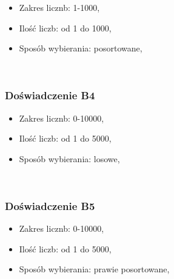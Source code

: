 \documentclass[11pt]{article}
\providecommand{\tightlist}{%
      \setlength{\itemsep}{0pt}\setlength{\parskip}{0pt}}
\begin{document}
\begin{itemize}
\tightlist
\item
  Zakres licznb: 1-1000,
\item
  Ilość liczb: od 1 do 1000,
\item
  Sposób wybierania: posortowane,
\end{itemize}

    \begin{center}
    \end{center}
    { \hspace*{\fill} \\}
    
    \hypertarget{doux15bwiadczenie-b4}{%
\subsubsection{Doświadczenie B4}\label{doux15bwiadczenie-b4}}

\begin{itemize}
\tightlist
\item
  Zakres licznb: 0-10000,
\item
  Ilość liczb: od 1 do 5000,
\item
  Sposób wybierania: losowe,
\end{itemize}


    \begin{center}
    \end{center}
    { \hspace*{\fill} \\}
    
    \hypertarget{doux15bwiadczenie-b5}{%
\subsubsection{Doświadczenie B5}\label{doux15bwiadczenie-b5}}

\begin{itemize}
\tightlist
\item
  Zakres licznb: 0-10000,
\item
  Ilość liczb: od 1 do 5000,
\item
  Sposób wybierania: prawie posortowane,
\end{itemize}

    \begin{center}
    \end{center}
    { \hspace*{\fill} \\}
    
\end{document}
